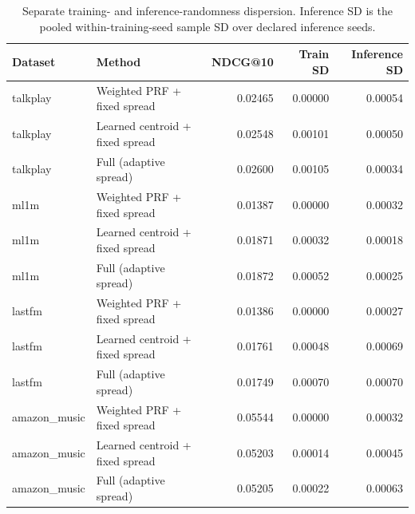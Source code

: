 \begin{table}[t]
\centering\scriptsize
\begin{tabular}{llrrr}
\toprule
Dataset & Method & NDCG@10 & Train SD & Inference SD \\
\midrule
talkplay & Weighted PRF + fixed spread & 0.02465 & 0.00000 & 0.00054 \\
talkplay & Learned centroid + fixed spread & 0.02548 & 0.00101 & 0.00050 \\
talkplay & Full (adaptive spread) & 0.02600 & 0.00105 & 0.00034 \\
ml1m & Weighted PRF + fixed spread & 0.01387 & 0.00000 & 0.00032 \\
ml1m & Learned centroid + fixed spread & 0.01871 & 0.00032 & 0.00018 \\
ml1m & Full (adaptive spread) & 0.01872 & 0.00052 & 0.00025 \\
lastfm & Weighted PRF + fixed spread & 0.01386 & 0.00000 & 0.00027 \\
lastfm & Learned centroid + fixed spread & 0.01761 & 0.00048 & 0.00069 \\
lastfm & Full (adaptive spread) & 0.01749 & 0.00070 & 0.00070 \\
amazon\_music & Weighted PRF + fixed spread & 0.05544 & 0.00000 & 0.00032 \\
amazon\_music & Learned centroid + fixed spread & 0.05203 & 0.00014 & 0.00045 \\
amazon\_music & Full (adaptive spread) & 0.05205 & 0.00022 & 0.00063 \\
\bottomrule
\end{tabular}
\caption{Separate training- and inference-randomness dispersion. Inference SD is the pooled within-training-seed sample SD over declared inference seeds.}
\label{tab:ecir-uncertainty}
\end{table}
